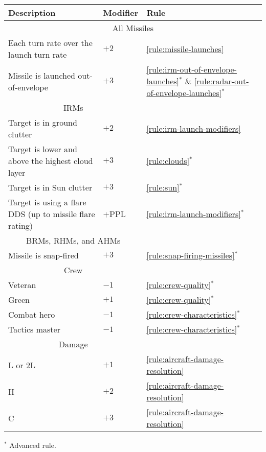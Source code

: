 {\begin{twocolumntable}
\begin{tabularx}{0.7\linewidth}{Xll}
\toprule
Description&Modifier&Rule\\
\midrule
\multicolumn{3}{c}{All Missiles}\\
\midrule
Each turn rate over the launch turn rate&$+2$&\ref{rule:missile-launches}\\
Missile is launched out-of-envelope&$+3$&\ref{rule:irm-out-of-envelope-launches}$^*$ \& \ref{rule:radar-out-of-envelope-launches}$^*$\\
\midrule
\multicolumn{2}{c}{IRMs}\\
\midrule
Target is in ground clutter&$+2$&\ref{rule:irm-launch-modifiers}\\
Target is lower and above the highest cloud layer&$+3$&\ref{rule:clouds}$^*$
\\
Target is in Sun clutter&$+3$&\ref{rule:sun}$^*$\\
Target is using a flare DDS (up to missile flare rating)&$+$PPL&\ref{rule:irm-launch-modifiers}$^*$\\
\midrule
\multicolumn{2}{c}{BRMs, RHMs, and AHMs}\\
\midrule
Missile is snap-fired&$+3$&\ref{rule:snap-firing-missiles}$^*$\\
\midrule
\multicolumn{2}{c}{Crew}\\
\midrule
Veteran&$-1$&\ref{rule:crew-quality}$^*$\\
Green&$+1$&\ref{rule:crew-quality}$^*$\\
Combat hero&$-1$&\ref{rule:crew-characteristics}$^*$\\
Tactics master&$-1$&\ref{rule:crew-characteristics}$^*$\\
\midrule
\multicolumn{2}{c}{Damage}\\
\midrule
L or 2L&$+1$&\ref{rule:aircraft-damage-resolution}\\
H&$+2$&\ref{rule:aircraft-damage-resolution}\\
C&$+3$&\ref{rule:aircraft-damage-resolution}\\
\bottomrule
\end{tabularx}
\begin{tablenote}{0.7\linewidth}
$^*$ Advanced rule.
\end{tablenote}
\end{twocolumntable}
}

